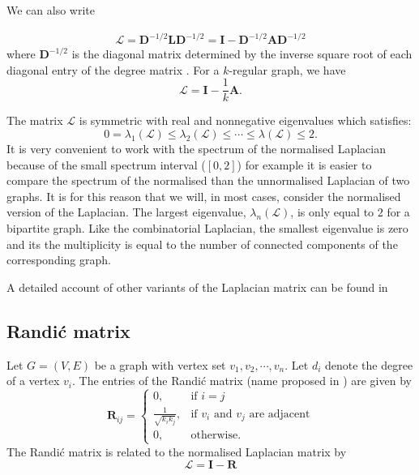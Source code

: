 \documentclass[10pt,a4paper]{article}
\begin{document}
We can also write 

\begin{eqnarray*}
	\mathbf{\mathcal{L}} = \mathbf{D}^{-1/2} \mathbf{L} \mathbf{D}^{-1/2} = \mathbf{I} -\mathbf{D}^{-1/2} \mathbf{A} \mathbf{D}^{-1/2}
\end{eqnarray*}
where $\mathbf{D}^{-1/2}$ is the diagonal matrix determined by the inverse square root of each diagonal entry of the degree matrix \citep{estrada2011structure}. For a $k$-regular graph, we have
\begin{equation}
\mathcal{L} = \mathbf{I}-\frac{1}{k} \mathbf{A}.
\end{equation}

The matrix $\mathcal{L}$ is symmetric with real and nonnegative eigenvalues which satisfies:
\begin{equation*}
0  = \lambda_1(\mathcal{L}) \leq  \lambda_2(\mathcal{L}) \leq \cdots \leq  \lambda(\mathcal{L}) \leq 2.
\end{equation*}
It is very convenient to work with the spectrum of the normalised Laplacian because of the small spectrum interval ($[0,2]$) for example it is easier to compare the spectrum of the normalised than the unnormalised Laplacian of two graphs. It is for this reason that we will, in most cases, consider the normalised version of the Laplacian.
The largest eigenvalue, $\lambda_n(\mathcal{L})$, is only equal to $2$ for a bipartite graph. Like the combinatorial Laplacian, the smallest eigenvalue is zero and its the multiplicity is equal to the number of connected components of the corresponding graph. 

A detailed account of other variants of the Laplacian matrix can be found in \citep{tsiatas2012diffusion}

\subsection{Randi\'{c} matrix}
Let $G=(V,E)$ be a graph with vertex set ${v_1,v_2, \cdots, v_n}$. Let $d_i$ denote the degree of a vertex $v_i$. The entries of the Randi\'{c} matrix (name proposed in \citep{bozkurt2010randic}) are given by
\begin{equation*}
\mathbf{R}_{ij} = \begin{cases} 0, &\mbox{if } i = j \\
\frac{1}{\sqrt{k_i k_j}}, &\mbox{if } v_i \text{ and } v_j \text{ are adjacent} \\ 
0, & \text{otherwise}.
\end{cases}
\end{equation*}
The Randi\'{c} matrix is related to the normalised Laplacian matrix by
\begin{equation}
\mathcal{L} = \mathbf{I} -\mathbf{R}
\end{equation}
\end{document}
